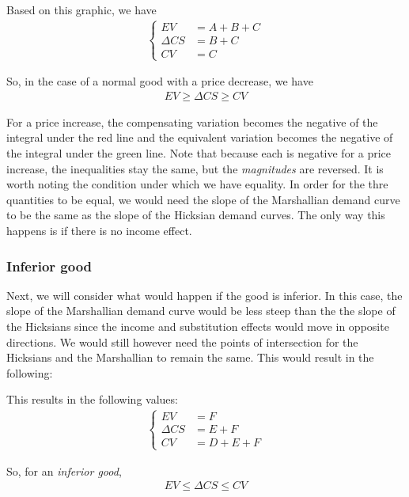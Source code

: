 Based on this graphic, we have
\begin{align*}
    \begin{cases}
        EV &= A + B + C \\
        \Delta CS &= B + C \\
        CV &= C
    \end{cases}
\end{align*}

So, in the case of a normal good with a price decrease, we have
\begin{align*}
    EV \geq \Delta CS \geq CV
\end{align*}

For a price increase, the compensating variation becomes the negative of the integral under the red line and the equivalent variation becomes the negative of the integral under the green line. Note that because each is negative for a price increase, the inequalities stay the same, but the \emph{magnitudes} are reversed. It is worth noting the condition under which we have equality. In order for the thre quantities to be equal, we would need the slope of the Marshallian demand curve to be the same as the slope of the Hicksian demand curves. The only way this happens is if there is no income effect.

\subsubsection*{Inferior good}
Next, we will consider what would happen if the good is inferior. In this case, the slope of the Marshallian demand curve would be less steep than the the slope of the Hicksians since the income and substitution effects would move in opposite directions. We would still however need the points of intersection for the Hicksians and the Marshallian to remain the same. This would result in the following:

This results in the following values:
\begin{align*}
    \begin{cases}
        EV &= F \\
        \Delta CS &= E + F \\
        CV &= D + E + F
    \end{cases}
\end{align*}

So, for an \emph{inferior good}, 
\begin{align*}
    EV \leq \Delta CS \leq CV
\end{align*}

